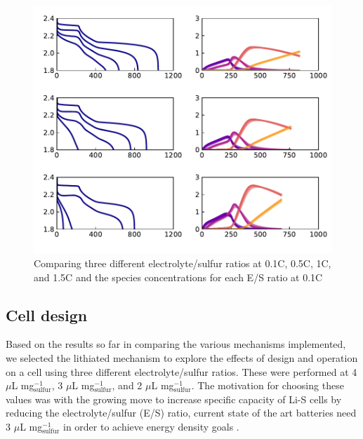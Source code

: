 \documentclass{elsarticle}
\begin{document}
\begin{figure}[b!]
    \centering
    \includegraphics[width=\textwidth]{Figures/Figure6_CellDesign_DischargeProfiles.pdf}
    \caption{Comparing three different electrolyte/sulfur ratios at 0.1C, 0.5C, 1C, and 1.5C and the species concentrations for each E/S ratio at 0.1C}
    \label{fig:E_S_ratio_comp}
\end{figure}
\subsection{Cell design}

Based on the results so far in comparing the various mechanisms implemented, we selected the lithiated mechanism to explore the effects of design and operation on a cell using three different electrolyte/sulfur ratios. These were performed at 4 $\mu$L mg$^{-1}_\mathrm{sulfur}$, 3 $\mu$L mg$^{-1}_\mathrm{sulfur}$, and 2 $\mu$L mg$^{-1}_\mathrm{sulfur}$. The motivation for choosing these values was with the growing move to increase specific capacity of Li-S cells by reducing the electrolyte/sulfur (E/S) ratio, current state of the art batteries need 3 $\mu$L mg$^{-1}_\mathrm{sulfur}$ in order to achieve energy density goals \cite{Kang2019}. 

\end{document}
